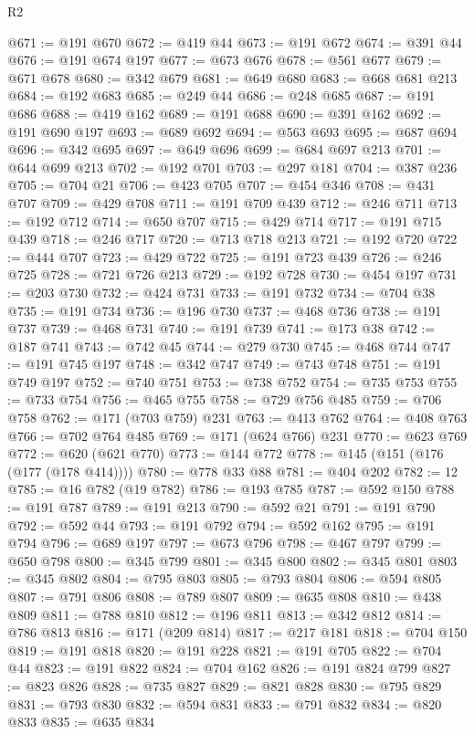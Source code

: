 \begin{lexlean}{R2}
\begin{coremodule}
@671 := @191 @670
@672 := @419 @44
@673 := @191 @672
@674 := @391 @44
@676 := @191 @674 @197
@677 := @673 @676
@678 := @561 @677
@679 := @671 @678
@680 := @342 @679
@681 := @649 @680
@683 := @668 @681 @213
@684 := @192 @683
@685 := @249 @44
@686 := @248 @685
@687 := @191 @686
@688 := @419 @162
@689 := @191 @688
@690 := @391 @162
@692 := @191 @690 @197
@693 := @689 @692
@694 := @563 @693
@695 := @687 @694
@696 := @342 @695
@697 := @649 @696
@699 := @684 @697 @213
@701 := @644 @699 @213
@702 := @192 @701
@703 := @297 @181
@704 := @387 @236
@705 := @704 @21
@706 := @423 @705
@707 := @454 @346
@708 := @431 @707
@709 := @429 @708
@711 := @191 @709 @439
@712 := @246 @711
@713 := @192 @712
@714 := @650 @707
@715 := @429 @714
@717 := @191 @715 @439
@718 := @246 @717
@720 := @713 @718 @213
@721 := @192 @720
@722 := @444 @707
@723 := @429 @722
@725 := @191 @723 @439
@726 := @246 @725
@728 := @721 @726 @213
@729 := @192 @728
@730 := @454 @197
@731 := @203 @730
@732 := @424 @731
@733 := @191 @732
@734 := @704 @38
@735 := @191 @734
@736 := @196 @730
@737 := @468 @736
@738 := @191 @737
@739 := @468 @731
@740 := @191 @739
@741 := @173 @38
@742 := @187 @741
@743 := @742 @45
@744 := @279 @730
@745 := @468 @744
@747 := @191 @745 @197
@748 := @342 @747
@749 := @743 @748
@751 := @191 @749 @197
@752 := @740 @751
@753 := @738 @752
@754 := @735 @753
@755 := @733 @754
@756 := @465 @755
@758 := @729 @756 @485
@759 := @706 @758
@762 := @171 (@703 @759) @231
@763 := @413 @762
@764 := @408 @763
@766 := @702 @764 @485
@769 := @171 (@624 @766) @231
@770 := @623 @769
@772 := @620 (@621 @770)
@773 := @144 @772
@778 := @145 (@151 (@176 (@177 (@178 @414))))
@780 := @778 @33 @88
@781 := @404 @202
@782 := 12
@785 := @16 @782 (@19 @782)
@786 := @193 @785
@787 := @592 @150
@788 := @191 @787
@789 := @191 @213
@790 := @592 @21
@791 := @191 @790
@792 := @592 @44
@793 := @191 @792
@794 := @592 @162
@795 := @191 @794
@796 := @689 @197
@797 := @673 @796
@798 := @467 @797
@799 := @650 @798
@800 := @345 @799
@801 := @345 @800
@802 := @345 @801
@803 := @345 @802
@804 := @795 @803
@805 := @793 @804
@806 := @594 @805
@807 := @791 @806
@808 := @789 @807
@809 := @635 @808
@810 := @438 @809
@811 := @788 @810
@812 := @196 @811
@813 := @342 @812
@814 := @786 @813
@816 := @171 (@209 @814)
@817 := @217 @181
@818 := @704 @150
@819 := @191 @818
@820 := @191 @228
@821 := @191 @705
@822 := @704 @44
@823 := @191 @822
@824 := @704 @162
@826 := @191 @824 @799
@827 := @823 @826
@828 := @735 @827
@829 := @821 @828
@830 := @795 @829
@831 := @793 @830
@832 := @594 @831
@833 := @791 @832
@834 := @820 @833
@835 := @635 @834

\end{coremodule}
\end{lexlean}
